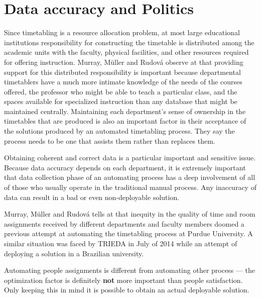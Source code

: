 \section{Data accuracy and Politics}
\label{sec:accuracy}

Since timetabling is a resource allocation problem, at most large educational institutions responsibility for constructing the timetable is distributed among the academic units with the faculty, physical facilities, and other resources required for offering instruction. Murray, M\"{u}ller and Rudov\'{a} observe at \cite{Murray2007} that providing support for this distributed responsibility is important because departmental timetablers have a much more intimate knowledge of the needs of the courses offered, the professor who might be able to teach a particular class, and the spaces available for specialized instruction than any database that might be maintained centrally. Maintaining each department's sense of ownership in the timetables that are produced is also an important factor in their acceptance of the solutions produced by an automated timetabling process. They say the process needs to be one that assists them rather than replaces them.

Obtaining coherent and correct data is a particular important and sensitive issue. Because data accuracy depends on each department, it is extremely important that data collection phase of an automating process has a deep involvement of all of those who usually operate in the traditional manual process. Any inaccuracy of data can result in a bad or even non-deployable solution.


Murray, M\"{u}ller and Rudov\'{a} tells at \cite{Murray2007} that inequity in the quality of time and room assignments received by different departments and faculty members doomed a previous attempt at automating the timetabling process at Purdue University. A similar situation was faced by TRIEDA in July of 2014 while an attempt of deploying a solution in a Brazilian university.

Automating people assignments is different from automating other process --- the optimization factor is definitely \textbf{not} more important than people satisfaction. Only keeping this in mind it is possible to obtain an actual deployable solution.

